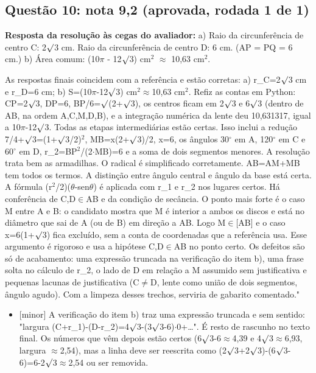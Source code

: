 \documentclass{article}%
\begin{document}
\subsection*{Questão 10: nota 9,2 (aprovada, rodada 1 de 1)}%
\textbf{Resposta da resolução às cegas do avaliador:} a) Raio da circunferência de centro C: 2$\surd$3 cm. Raio da circunferência de centro D: 6 cm. (AP = PQ = 6 cm.)\newline%
b) Área comum: (10$\pi$ - 12$\surd$3) cm$^2$ $\approx$ 10,63 cm$^2$.\par %
As respostas finais coincidem com a referência e estão corretas: a) r\_C=2$\surd$3 cm e r\_D=6 cm; b) S=(10$\pi$-12$\surd$3) cm$^2$$\approx$10,63 cm$^2$. Refiz as contas em Python: CP=2$\surd$3, DP=6, BP/6=$\surd$(2+$\surd$3), os centros ficam em 2$\surd$3 e 6$\surd$3 (dentro de AB, na ordem A,C,M,D,B), e a integração numérica da lente deu 10,631317, igual a 10$\pi$-12$\surd$3. Todas as etapas intermediárias estão certas. Isso inclui a redução 7/4+$\surd$3=(1+$\surd$3/2)$^2$, MB=x(2+$\surd$3)/2, x=6, os ângulos 30$^\circ$ em A, 120$^\circ$ em C e 60$^\circ$ em D, r\_2=BP$^2$/(2$\cdot$MB)=6 e a soma de dois segmentos menores. A resolução trata bem as armadilhas. O radical é simplificado corretamente. AB=AM+MB tem todos os termos. A distinção entre ângulo central e ângulo da base está certa. A fórmula (r$^2$/2)($\theta$-sen$\theta$) é aplicada com r\_1 e r\_2 nos lugares certos. Há conferência de C,D$\in$AB e da condição de secância. O ponto mais forte é o caso M entre A e B: o candidato mostra que M é interior a ambos os discos e está no diâmetro que sai de A (ou de B) em direção a AB. Logo M$\in${[}AB{]} e o caso x=6(1+$\surd$3) fica excluído, sem a conta de coordenadas que a referência usa. Esse argumento é rigoroso e usa a hipótese C,D$\in$AB no ponto certo. Os defeitos são só de acabamento: uma expressão truncada na verificação do item b), uma frase solta no cálculo de r\_2, o lado de D em relação a M assumido sem justificativa e pequenas lacunas de justificativa (C$\neq$D, lente como união de dois segmentos, ângulo agudo). Com a limpeza desses trechos, serviria de gabarito comentado."%
\begin{itemize}%
\item%
{[}minor{]} A verificação do item b) traz uma expressão truncada e sem sentido: "largura (C+r\_1)-(D-r\_2)=4$\surd$3-(3$\surd$3-6)$\cdot$0+\ldots{}". É resto de rascunho no texto final. Os números que vêm depois estão certos (6$\surd$3-6$\approx$4,39 e 4$\surd$3$\approx$6,93, largura $\approx$2,54), mas a linha deve ser reescrita como (2$\surd$3+2$\surd$3)-(6$\surd$3-6)=6-2$\surd$3$\approx$2,54 ou ser removida.%

\end{itemize}$$
\end{document}
